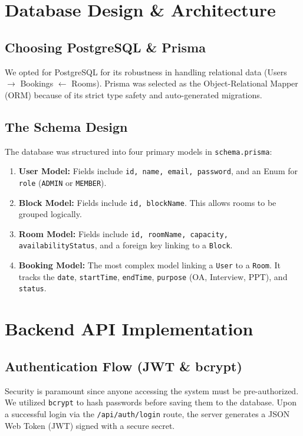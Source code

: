 \documentclass[12pt, a4paper]{report}
\begin{document}
\chapter{Database Design \& Architecture}

\section{Choosing PostgreSQL \& Prisma}
We opted for PostgreSQL for its robustness in handling relational data (Users $\rightarrow$ Bookings $\leftarrow$ Rooms). Prisma was selected as the Object-Relational Mapper (ORM) because of its strict type safety and auto-generated migrations.

\section{The Schema Design}
The database was structured into four primary models in \texttt{schema.prisma}:
\begin{enumerate}
    \item \textbf{User Model:} Fields include \texttt{id, name, email, password}, and an Enum for \texttt{role} (\texttt{ADMIN} or \texttt{MEMBER}).
    \item \textbf{Block Model:} Fields include \texttt{id, blockName}. This allows rooms to be grouped logically.
    \item \textbf{Room Model:} Fields include \texttt{id, roomName, capacity, availabilityStatus}, and a foreign key linking to a \texttt{Block}.
    \item \textbf{Booking Model:} The most complex model linking a \texttt{User} to a \texttt{Room}. It tracks the \texttt{date}, \texttt{startTime}, \texttt{endTime}, \texttt{purpose} (OA, Interview, PPT), and \texttt{status}.
\end{enumerate}

\chapter{Backend API Implementation}

\section{Authentication Flow (JWT \& bcrypt)}
Security is paramount since anyone accessing the system must be pre-authorized. We utilized \texttt{bcrypt} to hash passwords before saving them to the database. Upon a successful login via the \texttt{/api/auth/login} route, the server generates a JSON Web Token (JWT) signed with a secure secret. 
\end{document}
